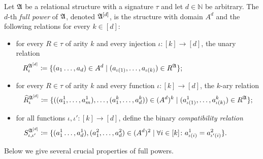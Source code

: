     Let $\mathfrak{A}$ be a relational structure with a signature $\tau$ and let $d\in\mathbb{N}$ be arbitrary.  
    The $d$-th \emph{full power} of $\mathfrak{A}$, denoted ${\mathfrak{A}}^{[d]}$, is the structure with domain $A^d$ and the following relations for every $k \in [d]$:
     \begin{itemize}
         \item for every $R\in \tau$ of arity $k$ and every injection $\iota\colon [k] \rightarrow [d]$, the unary relation 
         \begin{align*}
            R^{\fpwr{\struct{A}}{d}}_{\iota} \coloneqq \{ (a_1\dots, a_d)\in A^d \mid  (a_{\iota(1)},\dots,a_{\iota(k)}) \in R^\struct{A} \}; \hspace{3.5cm}
         \end{align*}
         \item  for every $R\in \tau$ of arity $k$ and every function $\iota\colon [k] \rightarrow [d]$, the $k$-ary relation
         \begin{align*}
             \widehat{R}^{ {\mathfrak{A}}^{[d]}}_{\iota} \mathrel{\mathop:}\mathrel{\mkern-1.2mu}= \{ ((a^1_1,\dots, a^1_m),\dots, (a^k_1,\dots, a^k_d)) \in (A^d)^k \mid  (a^1_{\iota(1)},\dots,a^k_{\iota(k)})\in R^{\mathfrak{A}}
               \};
         \end{align*}  
         \item for all functions $\iota,\iota' \colon [k] \rightarrow [d]$, define the binary \emph{compatibility relation} 
         \begin{align*}
             S^{{\mathfrak{A}}^{[d]}}_{\iota,\iota'} \mathrel{\mathop:}\mathrel{\mkern-1.2mu}= \{ (a^1_1\dots, a^1_d),(a^2_1,\dots,a^2_d)\in (A^d)^2 \mid \forall i \in [k] \colon a^1_{\iota(i)}=a^2_{\iota'(i)}    \}. \hspace{1.25cm}
         \end{align*}
          
    \end{itemize}  
%
 Below we give several crucial properties of full powers.

